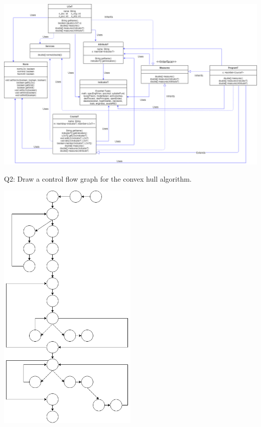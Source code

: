 \documentclass[12pt]{article}
\begin{document}
\begin{center}
  \includegraphics[width=1.2\textwidth]{A3UML.png}
\end{center}

\newpage

\noindent Q2: Draw a control flow graph for the convex hull algorithm.
\begin{center}
  \includegraphics[width=0.5\textwidth]{controlflow.png}
\end{center}
\end{document}
